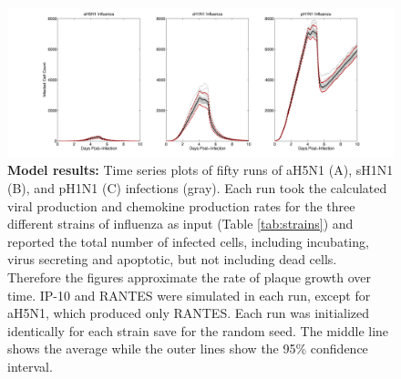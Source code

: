 \documentclass[10pt]{article}
\begin{document}
\begin{figure}[ht!]
\begin{center}
\includegraphics[width=\textwidth]{Figure_4}
 \end{center}
\caption{\textbf{Model results:} Time series plots of fifty runs of aH5N1 (A), sH1N1 (B), and pH1N1 (C) infections (gray). Each run took the calculated viral production and chemokine production rates for the three different strains of influenza as input (Table \ref{tab:strains}) and reported the total number of infected cells, including incubating, virus secreting and apoptotic, but not including dead cells.  Therefore the figures approximate the rate of plaque growth over time.  IP-10 and RANTES were simulated in each run, except for aH5N1, which  produced only RANTES.  Each run was initialized identically for each strain save for the random seed.  The middle line shows the average while the outer lines show the 95\% confidence interval.} 
 \label{fig:variance}
\end{figure}
\end{document}
